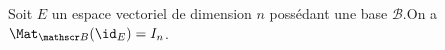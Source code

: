 Soit $E$ un espace vectoriel de dimension $n$ possédant une base $\mathscr B$.\newline  On a $\Mat_{\mathscr B}(\id_E) = I_n$.

\begin{reponses}
\end{reponses}

